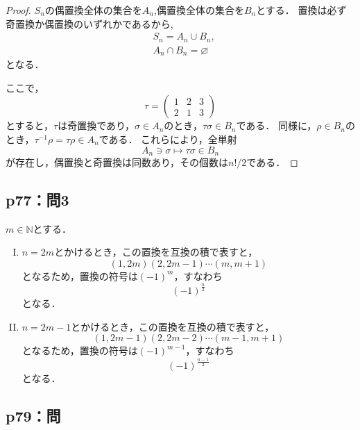 \documentclass[uplatex,dvipdfmx,a4paper,11pt,fleqn]{jsarticle}
\begin{document}
\begin{tleftbar}
    \begin{proof}
$S_n$の偶置換全体の集合を$A_n$,偶置換全体の集合を$B_n$とする．
置換は必ず奇置換か偶置換のいずれかであるから, 
\begin{align*} 
    & S_n = A_n \cup B_n , \\
    &A_n \cap B_n = \varnothing
\end{align*} 
となる．

ここで，
\[
    \tau = \begin{pmatrix} 1 & 2 & 3 \\ 2 & 1 & 3 \end{pmatrix}
\]
とすると，$\tau$は奇置換であり，$\sigma \in  A_n$のとき，$ \tau \sigma \in B_n$である．
同様に，$ \rho  \in B_n$のとき，$\tau^{-1} \rho = \tau \rho \in A_n$である．
これらにより，全単射
\[
    A_n \ni \sigma \mapsto \tau \sigma \in B_n
\]
が存在し，偶置換と奇置換は同数あり，その個数は$n! /2$である．
\end{proof}
\end{tleftbar}


\subsection*{p77：問3}

\begin{leftbar}
    $m \in \mathbb{N}$とする．
    \begin{enumerate}[(I)]
        \item $n=2m$とかけるとき，この置換を互換の積で表すと，
        \[
            (1,2m)(2,2m-1) \dotsm (m,m+1)
        \] 
        となるため，置換の符号は$(-1)^m$，すなわち
        \[
            (-1)^{\frac{n}{2}}
        \]
        となる．
        \item $n=2m-1$とかけるとき，この置換を互換の積で表すと，
        \[
            (1,2m-1)(2,2m-2) \dotsm (m-1,m+1)
        \] 
        となるため，置換の符号は$(-1)^{m-1}$，すなわち
        \[
            (-1)^{\frac{n-1}{2}}
        \]
        となる．
    \end{enumerate}
\end{leftbar}

\newpage 


\subsection*{p79：問}
\end{document}
